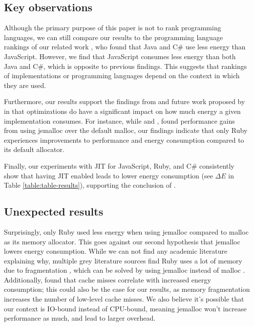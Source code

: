 \documentclass[main.tex]{subfiles}
\begin{document}
\subsection{Key observations}

Although the primary purpose of this paper is not to rank programming languages, we can still compare our results to the programming language rankings of our related work \cite{pereira2017energy, Pereira_Couto_Ribeiro_Rua_Cunha_Fernandes_Saraiva_2021, Couto_Pereira_Ribeiro_Rua_Saraiva_2017}, who found that Java and C\# use less energy than JavaScript. However, we find that JavaScript consumes less energy than both Java and C\#, which is opposite to previous findings. This suggests that rankings of implementations or programming languages depend on the context in which they are used.

Furthermore, our results support the findings from \textcite{Kempen_Kwon_Nguyen_Berger_2024} and future work proposed by \textcite{Pfeiffer_Offenberg_Pedersen_Landsgaard_Karlsen, Pfeiffer_Trindade_Meding_Harwick} in that optimizations do have a significant impact on how much energy a given implementation consumes. For instance, while \textcite{Li_Wu_Kavi_Mehta_Yadwadkar_John_2023} and \textcite{Lamprakos_Papadopoulos_Catthoor_Soudris_2022}, found performance gains from using jemalloc over the default malloc, our findings indicate that only Ruby experiences improvements to performance and energy consumption compared to its default allocator.

Finally, our experiments with JIT for JavaScript, Ruby, and C\# consistently show that having JIT enabled leads to lower energy consumption (see $\Delta E$ in Table \ref{table:table-results}), supporting the conclusion of  \textcite{Stoico_Dragomir_Lago_2025, Ournani_Belgaid_Rouvoy_Rust_Penhoat_2021, Hu_John_2006}.

\subsection{Unexpected results}
Surprisingly, only Ruby used less energy when using jemalloc compared to malloc as its memory allocator. This goes against our second hypothesis that jemalloc lowers energy consumption. While we can not find any academic literature explaining why, multiple grey literature sources find Ruby uses a lot of memory due to fragmentation \cite{ruby-developer-memory-fragmentation, ruby-memory-fargmentation-joyfulbikesheddingWhatCauses}, which can be solved by using jemalloc instead of malloc \cite{ruby-jemalloc-fix, ruby-sidekiq-jemalloc}. Additionally, \textcite{Kempen_Kwon_Nguyen_Berger_2024} found that cache misses correlate with increased energy consumption; this could also be the case for our results, as memory fragmentation increases the number of low-level cache misses. We also believe it's possible that our context is IO-bound instead of CPU-bound, meaning jemalloc won't increase performance as much, and lead to larger overhead.
\end{document}
